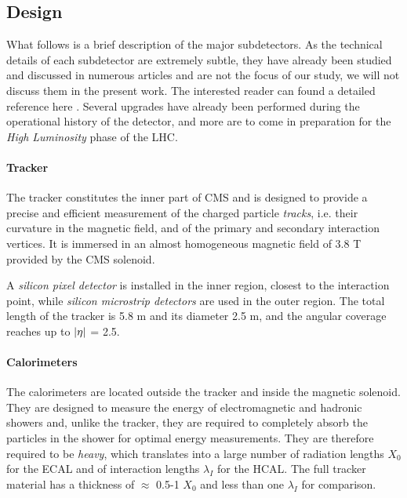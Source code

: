 \subsection{Design}

What follows is a brief description of the major subdetectors. As the technical details of each subdetector are extremely subtle, they have already been studied and discussed in numerous articles and are not the focus of our study, we will not discuss them in the present work. The interested reader can found a detailed reference here \cite{Collaboration_2008}. Several upgrades have already been performed during the operational history of the detector, and more are to come in preparation for the \emph{High Luminosity} phase of the LHC.

\paragraph{Tracker}

The tracker constitutes the inner part of CMS and is designed to provide a precise
and efficient measurement of the charged particle \emph{tracks}, i.e. their curvature in the magnetic field, and of the primary and secondary
interaction vertices. It is immersed in an almost homogeneous magnetic field of 3.8 T provided by the CMS solenoid.

A \emph{silicon pixel detector} is installed in the inner region, closest to the interaction point, while \emph{silicon
microstrip detectors} are used in the outer region. The total length of the tracker is 5.8 m
and its diameter 2.5 m, and the angular coverage reaches up to $\abs{\eta}$ = 2.5. 

\paragraph{Calorimeters}

The calorimeters are located outside the tracker and inside the magnetic solenoid. They are
designed to measure the energy of electromagnetic and hadronic showers and, unlike the
tracker, they are required to completely absorb the particles in the shower for optimal energy measurements. They are therefore required to be \emph{heavy}, which translates into a large
number of radiation lengths $X_0$ for the ECAL and of interaction lengths $\lambda_I$ for the HCAL.
The full tracker material has a thickness of $\approx$ 0.5-1 $X_0$ and less than one $\lambda_I$ for comparison.

